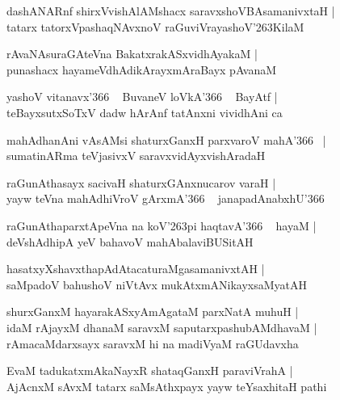 \documentclass[twoside,12pt,openright]{book}
\def\S{\char'263}
\newcounter{shloka}[chapter]
\begin{document}
\begin{shloka}%
dashANARnf shirxVvishAlAMshacx saravxshoVBAsamanivxtaH |\\
tatarx tatorxVpashaqNAvxnoV raGuviVrayashoV\S KilaM 
\end{shloka}

\begin{shloka}%
rAvaNAsuraGAteVna BakatxrakASxvidhAyakaM |\\
punashacx hayameVdhAdikArayxmAraBayx pAvanaM 
\end{shloka}

\begin{shloka}%
yashoV vitanavx\char'366 ~ BuvaneV loVkA\char'366 ~ BayAtf |\\
teBayxsutxSoTxV dadw hArAnf tatAnxni vividhAni ca 
\end{shloka}

\begin{shloka}%
mahAdhanAni vAsAMsi shaturxGanxH parxvaroV mahA\char'366 ~|\\
sumatinARma teVjasivxV saravxvidAyxvishAradaH 
\end{shloka}

\begin{shloka}%
raGunAthasayx sacivaH shaturxGAnxnucarov varaH |\\
yayw teVna mahAdhiVroV gArxmA\char'366 ~ janapadAnabxhU\char'366
\end{shloka}

\begin{shloka}%
raGunAthaparxtApeVna na koV\S pi haqtavA\char'366 ~ hayaM |\\
deVshAdhipA yeV bahavoV mahAbalaviBUSitAH 
\end{shloka}

\begin{shloka}%
hasatxyXshavxthapAdAtacaturaMgasamanivxtAH |\\
saMpadoV bahushoV niVtAvx mukAtxmANikayxsaMyatAH 
\end{shloka}

\begin{shloka}%
shurxGanxM hayarakASxyAmAgataM parxNatA muhuH |\\
idaM rAjayxM dhanaM saravxM saputarxpashubAMdhavaM |\\
rAmacaMdarxsayx saravxM hi na madiVyaM raGUdavxha 
\end{shloka}

\begin{shloka}%
EvaM tadukatxmAkaNayxR shataqGanxH paraviVrahA |\\
AjAcnxM sAvxM tatarx saMsAthxpayx yayw teYsaxhitaH pathi
\end{shloka}
\end{document}
